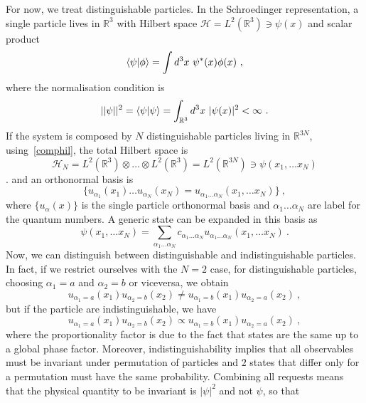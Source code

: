     For now, we treat distinguishable particles. In the Schroedinger representation, a single particle lives in $\mathbb R^3$ with Hilbert space $\mathcal H = L^2 (\mathbb R^3) \ni \psi(x)$ and scalar product
    \begin{equation*}
        \langle\psi\vert\phi\rangle = \int d^3 x ~ \psi^*(x) \phi(x) ~,
    \end{equation*}
    where the normalisation condition is 
    \begin{equation*}
        ||\psi||^2 = \langle\psi\vert\psi\rangle = \int_{\mathbb R^3} d^3 x ~ |\psi(x)|^2 < \infty ~.
    \end{equation*}
    If the system is composed by $N$ distinguishable particles living in $\mathbb R^{3N}$, using~\eqref{comphil}, the total Hilbert space is 
    \begin{equation*}
        \mathcal H_N = L^2(\mathbb R^3) \otimes \ldots \otimes L^2(\mathbb R^3) = L^2 (\mathbb R^{3N}) \ni \psi(x_1, \ldots x_N)
    \end{equation*}. 
    and an orthonormal basis is 
    \begin{equation*}
        \{u_{\alpha_1}(x_1) \ldots u_{\alpha_N} (x_N) = u_{\alpha_1 \ldots \alpha_N} (x_1, \ldots x_N)\} ~,
    \end{equation*} 
    where $\{u_\alpha (x)\}$ is the single particle orthonormal basis and $\alpha_1 \ldots \alpha_N$ are label for the quantum numbers. A generic state can be expanded in this basis as 
    \begin{equation*}
        \psi(x_1, \ldots x_N) = \sum_{\alpha_1 \ldots \alpha_N} c_{\alpha_1 \ldots \alpha_N} u_{\alpha_1 \ldots \alpha_N} (x_1, \ldots x_N) ~.
    \end{equation*}
    Now, we can distinguish between distinguishable and indistinguishable particles. In fact, if we restrict ourselves with the $N=2$ case, for distinguishable particles, choosing $\alpha_1 = a$ and $\alpha_2 = b$ or viceversa, we obtain
    \begin{equation*}
        u_{\alpha_1 = a} (x_1) u_{\alpha_2 = b} (x_2) \neq u_{\alpha_1 = b} (x_1) u_{\alpha_2 = a} (x_2) ~,
    \end{equation*}
    but if the particle are indistinguishable, we have 
    \begin{equation*}
        u_{\alpha_1 = a} (x_1) u_{\alpha_2 = b} (x_2) \propto u_{\alpha_1 = b} (x_1) u_{\alpha_2 = a} (x_2) ~,
    \end{equation*}
    where the proportionality factor is due to the fact that states are the same up to a global phase factor. Moreover, indistinguishability implies that all observables must be invariant under permutation of particles and $2$ states that differ only for a permutation must have the same probability. Combining all requests means that the physical quantity to be invariant is $|\psi|^2$ and not $\psi$, so that 
